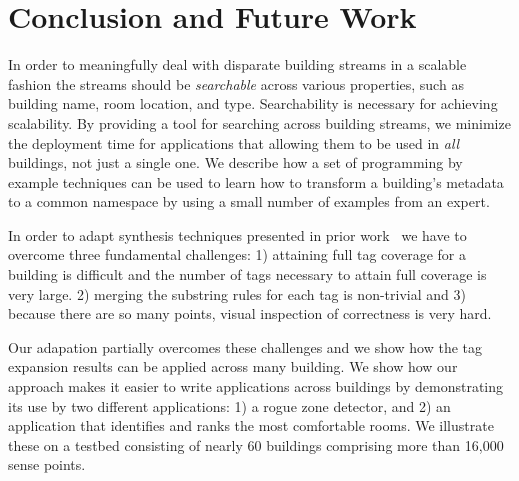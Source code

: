 \section{Conclusion and Future Work}


In order to meaningfully deal with disparate building streams in a scalable 
fashion the streams should be \emph{searchable} across various properties, such
as building name, room location, and type.
Searchability is necessary for achieving scalability.  By providing a tool for
searching across building streams, we minimize the deployment time for applications that 
allowing them to be used in \emph{all} buildings, not just a single one.  
We describe how a set of programming by example techniques can be used to
learn how to transform a building's metadata 
to a common namespace by using a small number of examples from an expert. 

In order to adapt synthesis techniques presented in prior work~\cite{Gulwani:2011} 
we have to overcome
three fundamental challenges: 1) attaining full tag coverage for a building
is difficult and the number of tags necessary to attain full coverage is very large.
2) merging the substring rules for each tag is non-trivial and 3) because there are so
many points, visual inspection of correctness is very hard.

Our adapation partially overcomes these challenges and we show how the tag expansion results can
be applied across many building.
We show how our approach makes it easier to write applications across buildings by
demonstrating its use by two different applications: 1) a rogue zone detector, and 
2) an application that identifies and ranks the most comfortable
rooms. We illustrate these on a testbed consisting of nearly 60 buildings comprising more 
than 16,000 sense points.





